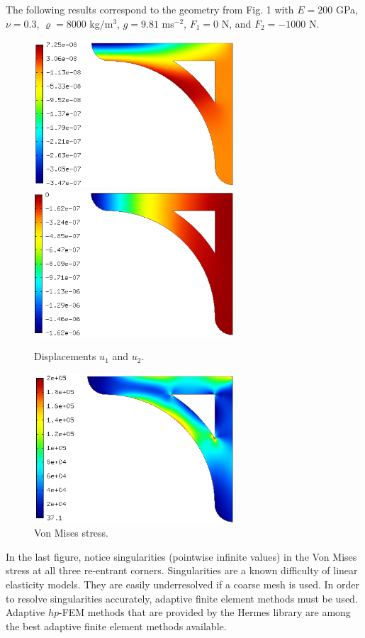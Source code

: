 \documentclass{article}
\begin{document}
The following results correspond to the geometry from Fig. 1 with 
$E = 200$ GPa, $\nu = 0.3$, $\varrho = 8000$ kg/m$^3$,
$g = 9.81$ ms$^{-2}$, $F_1 = 0$ N, and $F_2 = -1000$ N.

\newpage
\begin{figure}[!ht]
\begin{center}
\includegraphics[width=7.5cm]{img/result-1.png}\ \ \ \ \ \ 
\includegraphics[width=7.5cm]{img/result-2.png}
\caption{Displacements $u_1$ and $u_2$.}
\vspace{4mm}
\end{center}
\end{figure}

\begin{figure}[!ht]
\begin{center}
\includegraphics[width=7.5cm]{img/result-3.png}
\caption{Von Mises stress.}
\vspace{4mm}
\end{center}
\end{figure}
\noindent
In the last figure, notice singularities (pointwise infinite values) in the Von Mises 
stress at all three re-entrant corners. Singularities are a known difficulty of linear
elasticity models. They are easily underresolved if a coarse mesh is used. In order to 
resolve singularities accurately, adaptive finite element methods must be used. 
Adaptive $hp$-FEM methods that are provided by the Hermes library are among the 
best adaptive finite element methods available.
\end{document}
